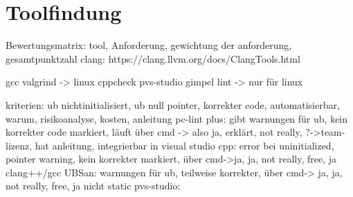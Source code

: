 \chapter{Toolfindung}
\label{ch:toolfindung}

Bewertungsmatrix: tool, Anforderung, gewichtung der anforderung, gesamtpunktzahl
clang: https://clang.llvm.org/docs/ClangTools.html


gcc
valgrind -> linux
cppcheck
pvs-studio
gimpel lint -> nur für linux

kriterien: ub nichtinitialisiert, ub null pointer, korrekter code, automatisierbar, warum, risikoanalyse, kosten, anleitung
pc-lint plus: gibt warnungen für ub, kein korrekter code markiert, läuft über cmd -> also ja, erklärt, not really, ?->team-lizenz, hat anleitung, integrierbar in visual studio
cpp: error bei uninitialized, pointer warning, kein korrekter markiert, über cmd->ja, ja, not really, free, ja
clang++/gcc UBSan: warnungen für ub, teilweise korrekter, über cmd-> ja, ja, not really, free, ja            nicht static
pvs-studio:
